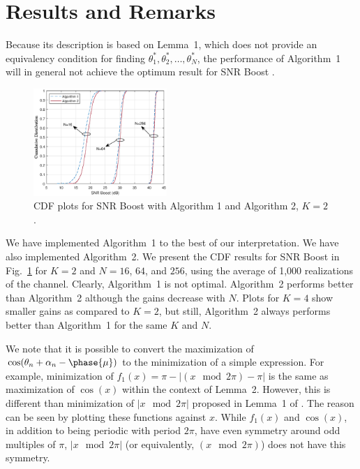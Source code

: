 %
\section{Results and Remarks}
%
Because its description is based on Lemma~1, which does not provide an equivalency condition
for finding $\theta_1^*, \theta_2^*, \ldots, \theta_N^*$, the performance of Algorithm~1 will
in general not achieve the optimum result for SNR Boost \cite{b1}.

\begin{figure}[!t]
\centering
\includegraphics[width=0.45\textwidth]{Overall_K2_N_16_64_256.eps}
\caption{CDF plots for SNR Boost with Algorithm 1 and Algorithm 2, $K=2$.}
 \label{fig:SNRBoostK2}
 \end{figure}

We have implemented Algorithm~1 to the best of our interpretation. We have also implemented
Algorithm~2.
We present the CDF results for SNR Boost \cite{b1} in Fig.~\ref{fig:SNRBoostK2} for $K=2$
and $N =16$, $64$, and $256$, using the average of 1,000 realizations of the channel.
Clearly,
Algorithm~1 is not optimal. Algorithm~2 performs better than Algorithm~2 although the
gains decrease with $N$. Plots for $K=4$ show smaller gains as compared to $K=2$, but
still, Algorithm~2 always performs better than Algorithm~1 for the same $K$ and $N$.

We note that it is possible to convert the maximization of $\cos(\theta_n+\alpha_n-\phase{\mu})$
to the minimization of a simple expression. For example, minimization of $f_1(x)=
\pi - | (x \!\! \mod 2\pi ) - \pi |$ is the same as maximization of $\cos(x)$ within
the context of Lemma~2. However, this is different than minimization of $|x \!\! \mod 2\pi|$
proposed in Lemma~1 of \cite{b1}. The reason can be
seen by plotting these functions against $x$. While $f_1(x)$ and $\cos(x)$, in
addition to being periodic with period $2\pi$, have even symmetry around odd
multiples of $\pi$, $| x \!\! \mod 2\pi |$ (or equivalently, $(x \!\! \mod 2\pi)$) does not
have this symmetry.

